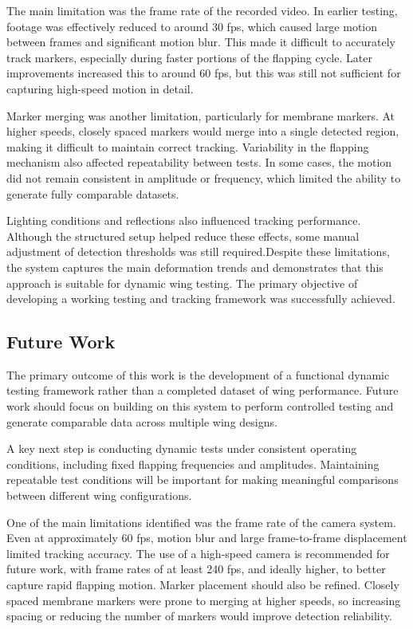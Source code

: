 The main limitation was the frame rate of the recorded video. In earlier testing, footage was effectively reduced to around 30 fps, which caused large motion between frames and significant motion blur. This made it difficult to accurately track markers, especially during faster portions of the flapping cycle. Later improvements increased this to around 60 fps, but this was still not sufficient for capturing high-speed motion in detail.
 
Marker merging was another limitation, particularly for membrane markers. At higher speeds, closely spaced markers would merge into a single detected region, making it difficult to maintain correct tracking. Variability in the flapping mechanism also affected repeatability between tests. In some cases, the motion did not remain consistent in amplitude or frequency, which limited the ability to generate fully comparable datasets.
 
Lighting conditions and reflections also influenced tracking performance. Although the structured setup helped reduce these effects, some manual adjustment of detection thresholds was still required.Despite these limitations, the system captures the main deformation trends and demonstrates that this approach is suitable for dynamic wing testing. The primary objective of developing a working testing and tracking framework was successfully achieved.
 
\subsection{Future Work}
 
The primary outcome of this work is the development of a functional dynamic testing framework rather than a completed dataset of wing performance. Future work should focus on building on this system to perform controlled testing and generate comparable data across multiple wing designs.
 
A key next step is conducting dynamic tests under consistent operating conditions, including fixed flapping frequencies and amplitudes. Maintaining repeatable test conditions will be important for making meaningful comparisons between different wing configurations.
 
One of the main limitations identified was the frame rate of the camera system. Even at approximately 60 fps, motion blur and large frame-to-frame displacement limited tracking accuracy. The use of a high-speed camera is recommended for future work, with frame rates of at least 240 fps, and ideally higher, to better capture rapid flapping motion. Marker placement should also be refined. Closely spaced membrane markers were prone to merging at higher speeds, so increasing spacing or reducing the number of markers would improve detection reliability.
 
